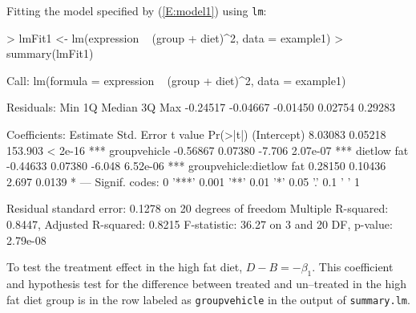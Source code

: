 \documentclass[12pt]{article}
\begin{document}
Fitting the model specified by  (\ref{E:model1}) using \texttt{lm}:
{\small 
\begin{Schunk}
\begin{Sinput}
> lmFit1 <- lm(expression ~ (group + diet)^2, data = example1)
> summary(lmFit1)
\end{Sinput}
\begin{Soutput}
Call:
lm(formula = expression ~ (group + diet)^2, data = example1)

Residuals:
     Min       1Q   Median       3Q      Max 
-0.24517 -0.04667 -0.01450  0.02754  0.29283 

Coefficients:
                         Estimate Std. Error t value Pr(>|t|)    
(Intercept)               8.03083    0.05218 153.903  < 2e-16 ***
groupvehicle             -0.56867    0.07380  -7.706 2.07e-07 ***
dietlow fat              -0.44633    0.07380  -6.048 6.52e-06 ***
groupvehicle:dietlow fat  0.28150    0.10436   2.697   0.0139 *  
---
Signif. codes:  0 '***' 0.001 '**' 0.01 '*' 0.05 '.' 0.1 ' ' 1 

Residual standard error: 0.1278 on 20 degrees of freedom
Multiple R-squared: 0.8447,	Adjusted R-squared: 0.8215 
F-statistic: 36.27 on 3 and 20 DF,  p-value: 2.79e-08 
\end{Soutput}
\end{Schunk}
}

To test the treatment effect in the high fat diet, $D-B = -\beta_1$. This coefficient and hypothesis test for the difference between treated and un--treated in the high fat diet group is in the row labeled as \texttt{groupvehicle} in the output of \texttt{summary.lm}. 
\end{document}
